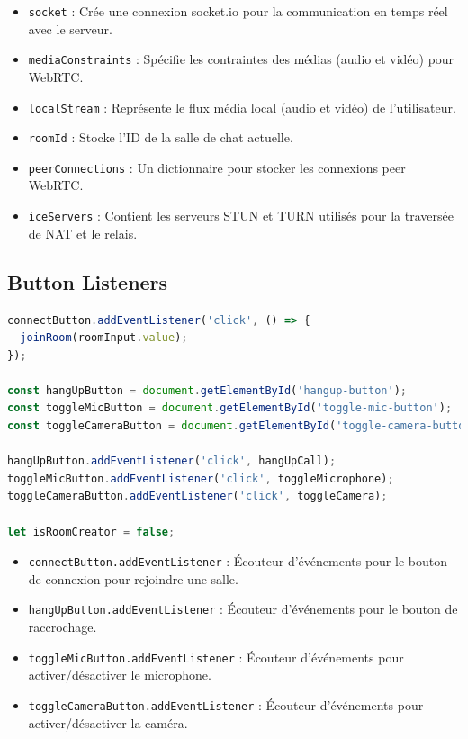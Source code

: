 \documentclass[12pt, a4paper, oneside]{Thesis}
\begin{document}
\begin{itemize}
  \item \verb|socket| : Crée une connexion socket.io pour la communication en temps réel avec le serveur.
  \item \verb|mediaConstraints| : Spécifie les contraintes des médias (audio et vidéo) pour WebRTC.
  \item \verb|localStream| : Représente le flux média local (audio et vidéo) de l'utilisateur.
  \item \verb|roomId| : Stocke l'ID de la salle de chat actuelle.
  \item \verb|peerConnections| : Un dictionnaire pour stocker les connexions peer WebRTC.
  \item \verb|iceServers| : Contient les serveurs STUN et TURN utilisés pour la traversée de NAT et le relais.
\end{itemize}

\newpage

\subsection{Button Listeners}

\begin{lstlisting}[language=JavaScript, caption={Button Listeners}, label=Button Listeners]
  connectButton.addEventListener('click', () => {
  joinRoom(roomInput.value);
});

const hangUpButton = document.getElementById('hangup-button');
const toggleMicButton = document.getElementById('toggle-mic-button');
const toggleCameraButton = document.getElementById('toggle-camera-button');

hangUpButton.addEventListener('click', hangUpCall);
toggleMicButton.addEventListener('click', toggleMicrophone);
toggleCameraButton.addEventListener('click', toggleCamera);

let isRoomCreator = false;
\end{lstlisting}

\begin{itemize}
  \item \verb|connectButton.addEventListener| : Écouteur d'événements pour le bouton de connexion pour rejoindre une salle.
  \item \verb|hangUpButton.addEventListener| : Écouteur d'événements pour le bouton de raccrochage.
  \item \verb|toggleMicButton.addEventListener| :  Écouteur d'événements pour activer/désactiver le microphone.
  \item \verb|toggleCameraButton.addEventListener| : Écouteur d'événements pour activer/désactiver la caméra.
\end{itemize}
\end{document}
